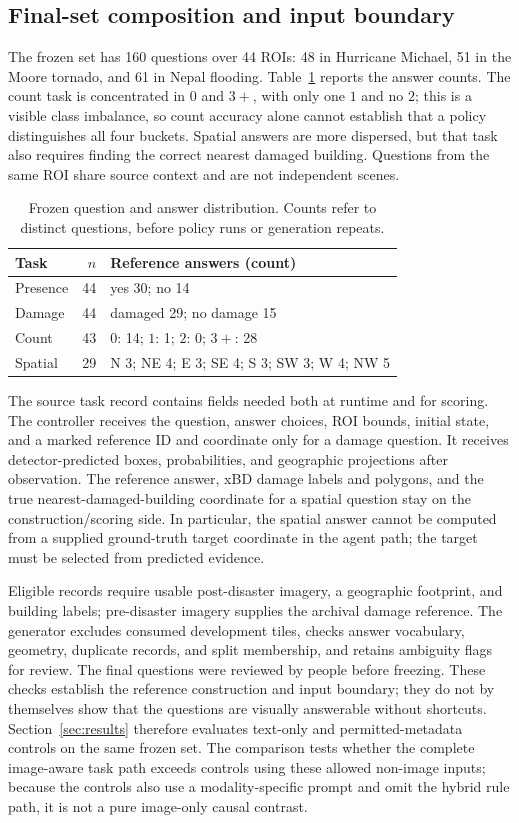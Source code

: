 \subsection{Final-set composition and input boundary}
The frozen set has 160 questions over 44 ROIs: 48 in Hurricane Michael, 51 in the Moore tornado, and 61 in Nepal flooding. Table~\ref{tab:answer-distribution} reports the answer counts. The count task is concentrated in $0$ and $3+$, with only one $1$ and no $2$; this is a visible class imbalance, so count accuracy alone cannot establish that a policy distinguishes all four buckets. Spatial answers are more dispersed, but that task also requires finding the correct nearest damaged building. Questions from the same ROI share source context and are not independent scenes.

\begin{table}[htbp]
\centering\small
\caption{Frozen question and answer distribution. Counts refer to distinct questions, before policy runs or generation repeats.}
\label{tab:answer-distribution}
\begin{tabularx}{\linewidth}{@{}l r X@{}}
\toprule
Task & $n$ & Reference answers (count)\\
\midrule
Presence & 44 & yes 30; no 14\\
Damage & 44 & damaged 29; no damage 15\\
Count & 43 & $0$: 14; $1$: 1; $2$: 0; $3+$: 28\\
Spatial & 29 & N 3; NE 4; E 3; SE 4; S 3; SW 3; W 4; NW 5\\
\bottomrule
\end{tabularx}
\end{table}

The source task record contains fields needed both at runtime and for scoring. The controller receives the question, answer choices, ROI bounds, initial state, and a marked reference ID and coordinate only for a damage question. It receives detector-predicted boxes, probabilities, and geographic projections after observation. The reference answer, xBD damage labels and polygons, and the true nearest-damaged-building coordinate for a spatial question stay on the construction/scoring side. In particular, the spatial answer cannot be computed from a supplied ground-truth target coordinate in the agent path; the target must be selected from predicted evidence.

Eligible records require usable post-disaster imagery, a geographic footprint, and building labels; pre-disaster imagery supplies the archival damage reference. The generator excludes consumed development tiles, checks answer vocabulary, geometry, duplicate records, and split membership, and retains ambiguity flags for review. The final questions were reviewed by people before freezing. These checks establish the reference construction and input boundary; they do not by themselves show that the questions are visually answerable without shortcuts. Section~\ref{sec:results} therefore evaluates text-only and permitted-metadata controls on the same frozen set. The comparison tests whether the complete image-aware task path exceeds controls using these allowed non-image inputs; because the controls also use a modality-specific prompt and omit the hybrid rule path, it is not a pure image-only causal contrast.
